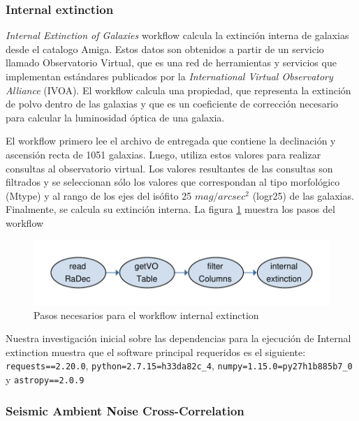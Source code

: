 \subsubsection{Internal extinction}

\textit{Internal Extinction of Galaxies} workflow calcula la extinción interna de galaxias desde el catalogo Amiga. Estos datos son obtenidos a partir de un servicio llamado Observatorio Virtual, que es una red de herramientas y servicios que implementan estándares publicados por la \textit{International Virtual Observatory Alliance} (IVOA). El workflow calcula una propiedad, que representa la extinción de polvo dentro de las galaxias y que es un coeficiente de corrección necesario para calcular la luminosidad óptica de una galaxia.

El workflow primero lee el archivo de entregada que contiene la declinación y ascensión recta de 1051 galaxias. Luego, utiliza estos valores para realizar consultas al observatorio virtual. Los valores resultantes de las consultas son filtrados y se seleccionan sólo los valores que correspondan al tipo morfológico (Mtype) y al rango de los ejes del isófito 25 $mag/arcsec^{2}$ (logr25) de las galaxias. Finalmente, se calcula su extinción interna. La figura \ref{fig:internal} muestra los pasos del workflow

\begin{figure}[t]
\centering
\includegraphics[width=.8\textwidth]{Figures/internal-extinction}
\caption{Pasos necesarios para el workflow internal extinction}\label{fig:internal}
\end{figure}

Nuestra investigación inicial sobre las dependencias para la ejecución de Internal extinction muestra que el software principal requeridos es el siguiente:  \verb|requests==2.20.0|, \verb|python=2.7.15=h33da82c_4|, \verb|numpy=1.15.0=py27h1b885b7_0| y \verb|astropy==2.0.9|



\subsubsection{Seismic Ambient Noise Cross-Correlation}


